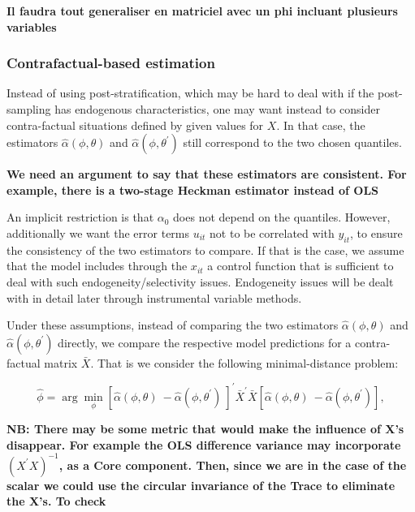 \documentclass[a4paper,notitlepage,thmsb,11pt]{article}
\begin{document}
\textbf{Il faudra tout generaliser en matriciel avec un phi incluant
plusieurs variables}

\subsubsection{Contrafactual-based estimation\protect\bigskip }

Instead of using post-stratification, which may be hard to deal with if the
post-sampling has endogenous characteristics, one may want instead to
consider contra-factual situations defined by given values for $X$. In that
case, the estimators $\hat{\alpha}(\phi ,\theta )$ and $\hat{\alpha}(\phi
,\theta ^{\prime })$ still correspond to the two chosen quantiles. 

\textbf{We need an argument to say that these estimators are consistent. For
example, there is a two-stage Heckman estimator instead of OLS}

An implicit restriction is that $\alpha _{0}$ does not depend on the
quantiles. However, additionally we want the error terms $u_{it}$ not to be
correlated with $y_{it}$, to ensure the consistency of the two estimators to
compare. If that is the case, we assume that the model includes through the $%
x_{it}$ a control function that is sufficient to deal with such
endogeneity/selectivity issues. Endogeneity issues will be dealt with in
detail later through instrumental variable methods.

Under these assumptions, instead of comparing the two estimators $\hat{\alpha%
}(\phi ,\theta )$ and $\hat{\alpha}(\phi ,\theta ^{\prime })$ directly, we
compare the respective model predictions for a contra-factual matrix $\bar{X}
$. That is we consider the following minimal-distance problem:

\begin{equation}
\hat{\phi}=\arg \min_{\phi }\left[ \hat{\alpha}(\phi ,\theta )~-\hat{\alpha}%
(\phi ,\theta ^{\prime })~\right] ^{\prime }\bar{X}^{\prime }\bar{X}\left[ 
\hat{\alpha}(\phi ,\theta )~-\hat{\alpha}(\phi ,\theta ^{\prime })\right] ,
\label{Mindistance_contrafact}
\end{equation}

\textbf{NB: There may be some metric that would make the influence of X's
disappear. For example the OLS difference variance may incorporate }$\left(
X^{\prime }X\right) ^{-1}$\textbf{, as a Core component. Then, since we are
in the case of the scalar we could use the circular invariance of the Trace
to eliminate the X's. To check}
\end{document}
